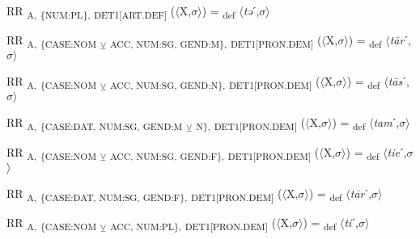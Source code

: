 {\begin{exe}
 RR \textsubscript{A,} \textsubscript{\{NUM:PL\},} \textsubscript{DET1[ART.DEF]} ($\langle$X,$\sigma $$\rangle$) = \textsubscript{def} $\langle$\textit{tə}ˊ,$\sigma $$\rangle$
\end{exe}

\begin{exe}
 RR \textsubscript{A,} \textsubscript{\{CASE:NOM} \textsubscript{${\veebar}$}\textsubscript{ ACC, NUM:SG, GEND:M\},} \textsubscript{DET1[PRON.DEM]} ($\langle$X,$\sigma $$\rangle$) = \textsubscript{def} $\langle$\textit{t\=ar}ˊ,$\sigma $$\rangle$
\end{exe}

\begin{exe}
 RR \textsubscript{A,} \textsubscript{\{CASE:NOM} \textsubscript{${\veebar}$}\textsubscript{ ACC, NUM:SG, GEND:N\},} \textsubscript{DET1[PRON.DEM]} ($\langle$X,$\sigma $$\rangle$) = \textsubscript{def} $\langle$\textit{t\=as}ˊ,$\sigma $$\rangle$
\end{exe}

\begin{exe}
 RR \textsubscript{A,} \textsubscript{\{CASE:DAT, NUM:SG, GEND:M} \textsubscript{${\veebar}$}\textsubscript{ N\},} \textsubscript{DET1[PRON.DEM]} ($\langle$X,$\sigma $$\rangle$) = \textsubscript{def} $\langle$\textit{tam}ˊ,$\sigma $$\rangle$
\end{exe}

\begin{exe}
 RR \textsubscript{A,} \textsubscript{\{CASE:NOM} \textsubscript{${\veebar}$}\textsubscript{ ACC, NUM:SG, GEND:F\},} \textsubscript{DET1[PRON.DEM]} ($\langle$X,$\sigma $$\rangle$) = \textsubscript{def} $\langle$\textit{tie}ˊ,$\sigma $$\rangle$
\end{exe}

\begin{exe}
 RR \textsubscript{A,} \textsubscript{\{CASE:DAT, NUM:SG, GEND:F\},} \textsubscript{DET1[PRON.DEM]} ($\langle$X,$\sigma $$\rangle$) = \textsubscript{def} $\langle$\textit{t\=ar}ˊ,$\sigma $$\rangle$
\end{exe}

\begin{exe}
 RR \textsubscript{A,} \textsubscript{\{CASE:NOM} \textsubscript{${\veebar}$}\textsubscript{ ACC, NUM:PL\},} \textsubscript{DET1[PRON.DEM]} ($\langle$X,$\sigma $$\rangle$) = \textsubscript{def} $\langle$\textit{ti}ˊ,$\sigma $$\rangle$
\end{exe}

}
